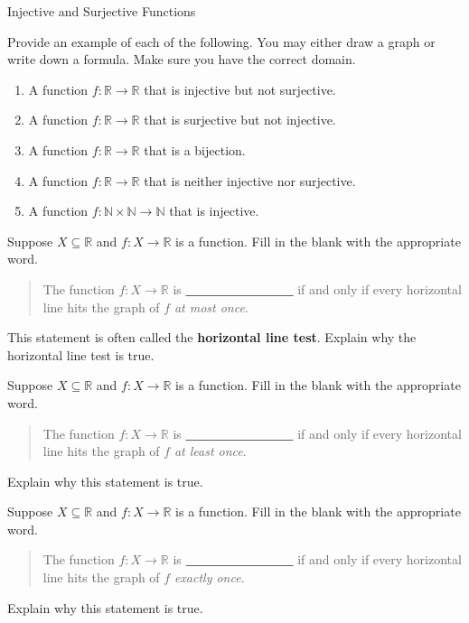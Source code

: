 \begin{section}{Injective and Surjective Functions}
\begin{problem}
Provide an example of each of the following.  You may either draw a graph or write down a formula.  Make sure you have the correct domain.
\begin{enumerate}[label=\textrm{(\alph*)}]
\item A function $f:\mathbb{R}\to \mathbb{R}$ that is injective but not surjective.
\item A function $f:\mathbb{R}\to \mathbb{R}$ that is surjective but not injective.
\item A function $f:\mathbb{R}\to \mathbb{R}$ that is a bijection.
\item A function $f:\mathbb{R}\to \mathbb{R}$ that is neither injective nor surjective.
\item A function $f:\mathbb{N}\times\mathbb{N}\to \mathbb{N}$ that is injective.
\end{enumerate}
\end{problem}

\begin{problem}
Suppose $X\subseteq \mathbb{R}$ and $f:X\to \mathbb{R}$ is a function. Fill in the blank with the appropriate word.
\begin{quote}
The function $f:X\to \mathbb{R}$ is \underline{\ \ \ \ \ \ \ \  \ \ \ \ \ \ \ \ \ } if and only if every horizontal line hits the graph of $f$ \emph{at most once}.
\end{quote}
This statement is often called the \textbf{horizontal line test}.  Explain why the horizontal line test is true.
\end{problem}

\begin{problem}
Suppose $X\subseteq \mathbb{R}$ and $f:X\to \mathbb{R}$ is a function. Fill in the blank with the appropriate word.
\begin{quote}
The function $f:X\to \mathbb{R}$ is \underline{\ \ \ \ \ \ \ \  \ \ \ \ \ \ \ \ \ } if and only if every horizontal line hits the graph of $f$ \emph{at least once}.
\end{quote}
Explain why this statement is true.
\end{problem}

\begin{problem}
Suppose $X\subseteq \mathbb{R}$ and $f:X\to \mathbb{R}$ is a function. Fill in the blank with the appropriate word.
\begin{quote}
The function $f:X\to \mathbb{R}$ is \underline{\ \ \ \ \ \ \ \  \ \ \ \ \ \ \ \ \ } if and only if every horizontal line hits the graph of $f$ \emph{exactly once}.
\end{quote}
Explain why this statement is true.
\end{problem}


\end{section}
